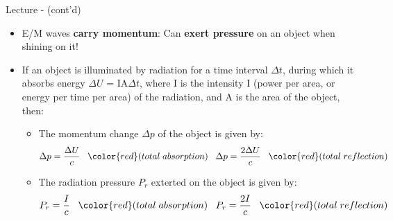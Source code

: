 %
%
%

\begin{frame}{Lecture \summarizedlecture - \lecturesummarytitle (cont'd)}

\begin{itemize}

\item
E/M waves {\bf carry momentum}:
Can {\bf exert pressure} on an object when shining on it!\\
\item
If an object is illuminated by radiation for a time interval ${\Delta}t$,
during which it absorbs energy ${\Delta}U$ = IA${\Delta}t$,
where I is the intensity I (power per area, or energy per time
per area) of the radiation, and A is the area of the object, then:
\begin{itemize}
\item
The momentum change ${\Delta}p$ of the object is given by:
\begin{equation*}
    {\Delta}p = \frac{{\Delta}U}{c}
    \;\;\; {\color{red} \small (total \; absorption)}
    \;\;\;
    {\Delta}p = \frac{2{\Delta}U}{c}
    \;\;\; {\color{red} \small (total \; reflection)}
\end{equation*}
\item
The radiation pressure $P_r$ exterted on the object is given by:
\begin{equation*}
  P_r = \frac{I}{c}
  \;\;\; {\color{red} \small (total \; absorption)}
  \;\;\;
  P_r = \frac{2I}{c}
  \;\;\; {\color{red} \small (total \; reflection)}
\end{equation*}
\end{itemize}

\end{itemize}

\end{frame}
